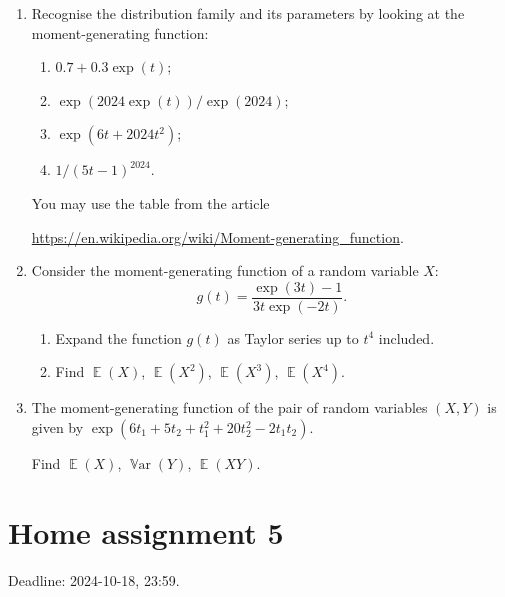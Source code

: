 \documentclass[12pt]{article}
\DeclareMathOperator{\Var}{\mathbb{V}ar}
\DeclareMathOperator{\E}{\mathbb{E}}
\begin{document}
\begin{enumerate}
    \item Recognise the distribution family and its parameters by looking at the moment-generating function:
    
    \begin{enumerate}
        \item $0.7 + 0.3\exp(t)$;
        \item $\exp(2024\exp(t)) / \exp(2024)$;
        \item $\exp(6t + 2024t^2)$;
        \item $1/(5t - 1)^{2024}$.
    \end{enumerate}
    
    You may use the table from the article 
    
    \url{https://en.wikipedia.org/wiki/Moment-generating_function}.
    
    \item Consider the moment-generating function of a random variable $X$:
    \[
     g(t) = \frac{\exp(3t) - 1}{3t\exp(-2t)}.
    \]
    
    \begin{enumerate}
        \item Expand the function $g(t)$ as Taylor series up to $t^4$ included. 
        \item Find $\E(X)$, $\E(X^2)$, $\E(X^3)$, $\E(X^4)$.
    \end{enumerate}


    \item The moment-generating function of the pair of random variables $(X, Y)$ is given by 
    $\exp(6t_1 + 5t_2 + t_1^2 + 20t_2^2 - 2t_1t_2)$.

    Find $\E(X)$, $\Var(Y)$, $\E(XY)$.
    
\end{enumerate}



\section*{Home assignment 5}

Deadline: 2024-10-18, 23:59.
\end{document}

